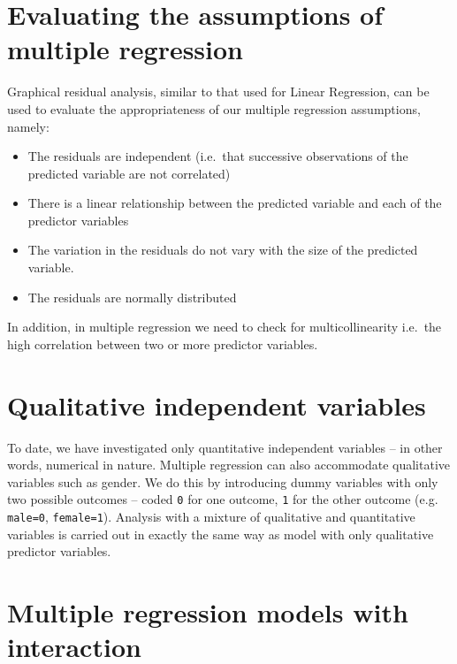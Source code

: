 \documentclass[12pt,a4paper,openany,twoside]{report}
\theoremstyle{definition}
\theoremstyle{remark}
\theoremstyle{plain}
\theoremstyle{definition}
\theoremstyle{definition}
\theoremstyle{definition}
\theoremstyle{remark}
\begin{document}
\hypertarget{mlrevaluate}{%
\section{Evaluating the assumptions of multiple regression}\label{mlrevaluate}}

Graphical residual analysis, similar to that used for Linear Regression,
can be used to evaluate the appropriateness of our multiple regression
assumptions, namely:

\begin{itemize}
\item
  The residuals are independent (i.e.~that successive observations of
  the predicted variable are not correlated)
\item
  There is a linear relationship between the predicted variable and each
  of the predictor variables
\item
  The variation in the residuals do not vary with the size of the
  predicted variable.
\item
  The residuals are normally distributed
\end{itemize}

In addition, in multiple regression we need to check for
multicollinearity i.e.~the high correlation between two or more
predictor variables.

\newpage

\hypertarget{mlrcategories}{%
\section{Qualitative independent variables}\label{mlrcategories}}

To date, we have investigated only quantitative independent variables --
in other words, numerical in nature. Multiple regression can also
accommodate qualitative variables such as gender. We do this by
introducing dummy variables with only two possible outcomes -- coded \texttt{0}
for one outcome, \texttt{1} for the other outcome (e.g. \texttt{male=0}, \texttt{female=1}).
Analysis with a mixture of qualitative and quantitative variables is
carried out in exactly the same way as model with only qualitative
predictor variables.

\hypertarget{mlrinteraction}{%
\section{Multiple regression models with interaction}\label{mlrinteraction}}
\end{document}
